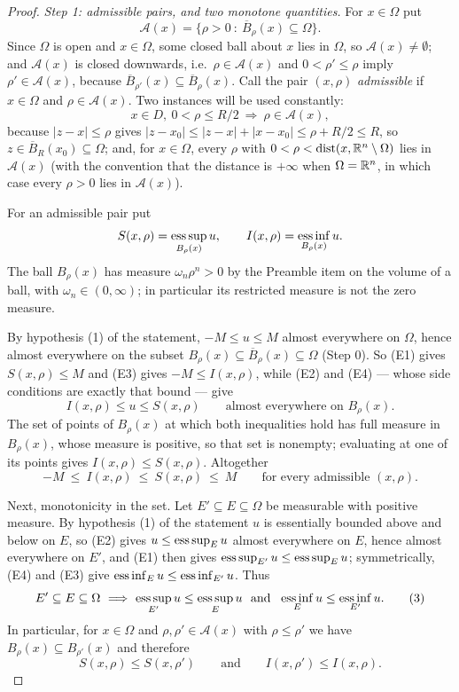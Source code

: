 \begin{proof}
\emph{Step 1: admissible pairs, and two monotone quantities.}  For $x\in\Omega$
put
\[
\mathcal A(x)=\bigl\{\rho>0\ :\ \overline B_\rho(x)\subseteq\Omega\bigr\} .
\]
Since $\Omega$ is open and $x\in\Omega$, some closed ball about $x$ lies in
$\Omega$, so $\mathcal A(x)\ne\emptyset$; and $\mathcal A(x)$ is closed
downwards, i.e.\ $\rho\in\mathcal A(x)$ and $0<\rho'\le\rho$ imply
$\rho'\in\mathcal A(x)$, because $\overline B_{\rho'}(x)\subseteq\overline
B_\rho(x)$.  Call the pair $(x,\rho)$ \emph{admissible} if $x\in\Omega$ and
$\rho\in\mathcal A(x)$.  Two instances will be used constantly:
\[
x\in D,\ 0<\rho\le R/2\ \Longrightarrow\ \rho\in\mathcal A(x),
\tag{1}
\]
because $|z-x|\le\rho$ gives $|z-x_0|\le|z-x|+|x-x_0|\le\rho+R/2\le R$, so
$z\in\overline B_R(x_0)\subseteq\Omega$; and, for $x\in\Omega$,
every $\rho$ with $0<\rho<\operatorname{dist}(x,\mathbb{R}^n\setminus\Omega)$ lies in
$\mathcal A(x)$ (with the convention that the distance is $+\infty$ when
$\Omega=\mathbb{R}^n$, in which case every $\rho>0$ lies in $\mathcal A(x)$).

For an admissible pair put
\[
S(x,\rho)=\operatorname*{ess\,sup}_{B_\rho(x)}u,
\qquad
I(x,\rho)=\operatorname*{ess\,inf}_{B_\rho(x)}u .
\]
The ball $B_\rho(x)$ has measure $\omega_n\rho^n>0$ by the Preamble item on the
volume of a ball, with $\omega_n\in(0,\infty)$; in particular its restricted
measure is not the zero measure.

By hypothesis (1) of the statement, $-M\le u\le M$ almost everywhere on
$\Omega$, hence almost everywhere on the subset
$B_\rho(x)\subseteq\overline B_\rho(x)\subseteq\Omega$ (Step 0).  So (E1) gives
$S(x,\rho)\le M$ and (E3) gives $-M\le I(x,\rho)$, while (E2) and (E4) ---
whose side conditions are exactly that bound --- give
\[
I(x,\rho)\le u\le S(x,\rho)\qquad\text{almost everywhere on }B_\rho(x).
\]
The set of points of $B_\rho(x)$ at which both inequalities hold has full
measure in $B_\rho(x)$, whose measure is positive, so that set is nonempty;
evaluating at one of its points gives $I(x,\rho)\le S(x,\rho)$.  Altogether
\[
-M\ \le\ I(x,\rho)\ \le\ S(x,\rho)\ \le\ M
\qquad\text{for every admissible }(x,\rho).
\tag{2}
\]

Next, monotonicity in the set.  Let $E'\subseteq E\subseteq\Omega$ be measurable
with positive measure.  By hypothesis (1) of the statement $u$ is essentially
bounded above and below on $E$, so (E2) gives
$u\le\operatorname*{ess\,sup}_Eu$ almost everywhere on $E$, hence almost
everywhere on $E'$, and (E1) then gives
$\operatorname*{ess\,sup}_{E'}u\le\operatorname*{ess\,sup}_Eu$; symmetrically,
(E4) and (E3) give
$\operatorname*{ess\,inf}_Eu\le\operatorname*{ess\,inf}_{E'}u$.  Thus
\[
E'\subseteq E\subseteq\Omega\ \Longrightarrow\
\operatorname*{ess\,sup}_{E'}u\le\operatorname*{ess\,sup}_{E}u
\ \text{ and }\
\operatorname*{ess\,inf}_{E}u\le\operatorname*{ess\,inf}_{E'}u .
\tag{3}
\]
In particular, for $x\in\Omega$ and $\rho,\rho'\in\mathcal A(x)$ with
$\rho\le\rho'$ we have $B_\rho(x)\subseteq B_{\rho'}(x)$ and therefore
\[
S(x,\rho)\le S(x,\rho')\qquad\text{and}\qquad I(x,\rho')\le I(x,\rho).
\tag{4}
\]


\end{proof}
